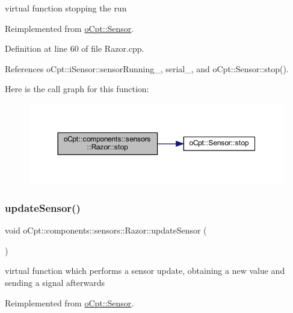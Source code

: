 virtual function stopping the run 

Reimplemented from \hyperlink{classo_cpt_1_1_sensor_a44ad78c2c091ca9cf72295293f8c5b74}{o\+Cpt\+::\+Sensor}.



Definition at line 60 of file Razor.\+cpp.



References o\+Cpt\+::i\+Sensor\+::sensor\+Running\+\_\+, serial\+\_\+, and o\+Cpt\+::\+Sensor\+::stop().

Here is the call graph for this function\+:
\nopagebreak
\begin{figure}[H]
\begin{center}
\leavevmode
\includegraphics[width=350pt]{classo_cpt_1_1components_1_1sensors_1_1_razor_a807441c137892ee3c1b612c284893fa1_cgraph}
\end{center}
\end{figure}
\hypertarget{classo_cpt_1_1components_1_1sensors_1_1_razor_ac8ee1582eb5c478c73e5e050858d2d7d}{}\label{classo_cpt_1_1components_1_1sensors_1_1_razor_ac8ee1582eb5c478c73e5e050858d2d7d} 
\subsubsection{\texorpdfstring{update\+Sensor()}{updateSensor()}}
{\footnotesize\ttfamily void o\+Cpt\+::components\+::sensors\+::\+Razor\+::update\+Sensor (\begin{DoxyParamCaption}{ }\end{DoxyParamCaption})\hspace{0.3cm}{\ttfamily [virtual]}}

virtual function which performs a sensor update, obtaining a new value and sending a signal afterwards 

Reimplemented from \hyperlink{classo_cpt_1_1_sensor_ab4b0dedb06f11bcf2368852035beb2b2}{o\+Cpt\+::\+Sensor}.



